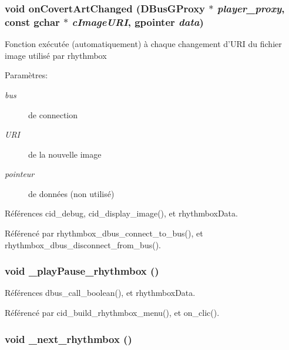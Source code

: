 \subsubsection{\setlength{\rightskip}{0pt plus 5cm}void onCovertArtChanged (DBusGProxy $\ast$ {\em player\_\-proxy}, \/  const gchar $\ast$ {\em cImageURI}, \/  gpointer {\em data})}\label{cid-rhythmbox_8c_7af9b89f4f0b3abc7ec452aa3c10797b}


Fonction exécutée (automatiquement) à chaque changement d'URI du fichier image utilisé par rhythmbox \begin{Desc}
\item[Paramètres:]
\begin{description}
\item[{\em bus}]de connection \item[{\em URI}]de la nouvelle image \item[{\em pointeur}]de données (non utilisé) \end{description}
\end{Desc}


Références cid\_\-debug, cid\_\-display\_\-image(), et rhythmboxData.

Référencé par rhythmbox\_\-dbus\_\-connect\_\-to\_\-bus(), et rhythmbox\_\-dbus\_\-disconnect\_\-from\_\-bus().
\subsubsection{\setlength{\rightskip}{0pt plus 5cm}void \_\-playPause\_\-rhythmbox ()}\label{cid-rhythmbox_8c_e233e4a0b9a614cc2f79052b71d0b3c9}




Références dbus\_\-call\_\-boolean(), et rhythmboxData.

Référencé par cid\_\-build\_\-rhythmbox\_\-menu(), et on\_\-clic().
\subsubsection{\setlength{\rightskip}{0pt plus 5cm}void \_\-next\_\-rhythmbox ()}\label{cid-rhythmbox_8c_798383583dab734ec475d8ccc6880c2f}




